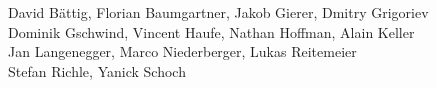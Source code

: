 %
%
%
David Bättig,		%
Florian Baumgartner,	%
Jakob Gierer,		%
Dmitry Grigoriev%
\\
Dominik Gschwind,	%
Vincent Haufe,		%
Nathan Hoffman,		%
Alain Keller%
\\
Jan Langenegger,	%
Marco Niederberger,	%
Lukas Reitemeier%
\\
Stefan Richle,		%
Yanick Schoch		%
